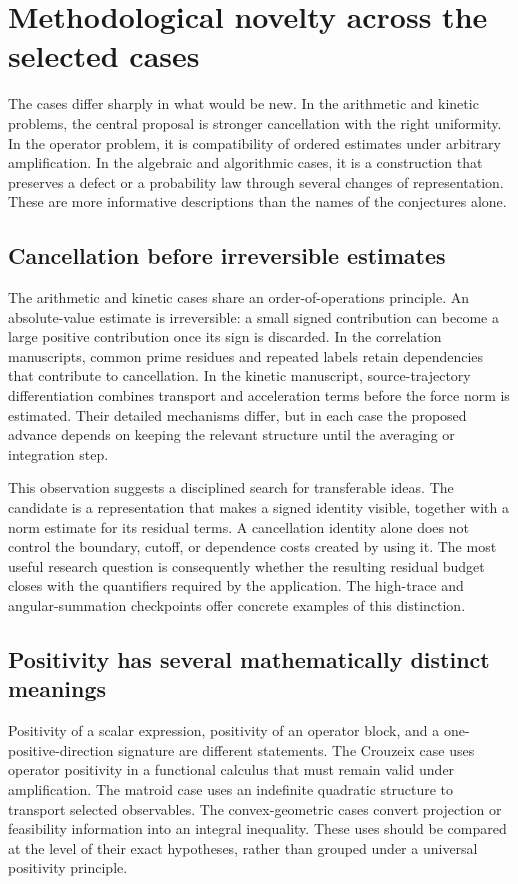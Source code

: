 \section{Methodological novelty across the selected cases}
\label{sec:synthesis}
The cases differ sharply in what would be new. In the arithmetic and
kinetic problems, the central proposal is stronger cancellation with
the right uniformity. In the operator problem, it is compatibility of
ordered estimates under arbitrary amplification. In the algebraic and
algorithmic cases, it is a construction that preserves a defect or a
probability law through several changes of representation. These are
more informative descriptions than the names of the conjectures alone.



\subsection{Cancellation before irreversible estimates}
The arithmetic and kinetic cases share an order-of-operations principle.
An absolute-value estimate is irreversible: a small signed contribution
can become a large positive contribution once its sign is discarded.
In the correlation manuscripts, common prime residues and repeated labels
retain dependencies that contribute to cancellation. In the kinetic
manuscript, source-trajectory differentiation combines transport and
acceleration terms before the force norm is estimated. Their detailed
mechanisms differ, but in each case the proposed advance depends on
keeping the relevant structure until the averaging or integration step.

This observation suggests a disciplined search for transferable ideas.
The candidate is a representation that makes a signed identity visible,
together with a norm estimate for its residual terms. A cancellation
identity alone does not control the boundary, cutoff, or dependence costs
created by using it. The most useful research question is consequently
whether the resulting residual budget closes with the quantifiers required
by the application. The high-trace and angular-summation checkpoints offer
concrete examples of this distinction.

\subsection{Positivity has several mathematically distinct meanings}
Positivity of a scalar expression, positivity of an operator block, and a
one-positive-direction signature are different statements. The Crouzeix
case uses operator positivity in a functional calculus that must remain
valid under amplification. The matroid case uses an indefinite quadratic
structure to transport selected observables. The convex-geometric cases
convert projection or feasibility information into an integral inequality.
These uses should be compared at the level of their exact hypotheses,
rather than grouped under a universal positivity principle.

